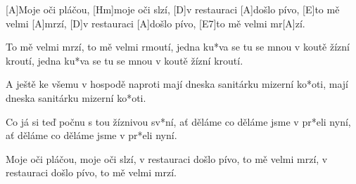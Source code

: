 
[A]Moje oči pláčou, [Hm]moje oči slzí,
[D]v restauraci [A]došlo pívo, [E]to mě velmi [A]mrzí,
[D]v restauraci [A]došlo pívo, [E7]to mě velmi mr[A]zí.

To mě velmi mrzí, to mě velmi rmoutí,
jedna ku*va se tu se mnou v koutě žízní kroutí,
jedna ku*va se tu se mnou v koutě žízní kroutí.

A ještě ke všemu v hospodě naproti
mají dneska sanitárku mizerní ko*oti,
mají dneska sanitárku mizerní ko*oti.

Co já si teď počnu s tou žíznivou sv*ní,
ať děláme co děláme jsme v pr*eli nyní,
ať děláme co děláme jsme v pr*eli nyní.

Moje oči pláčou, moje oči slzí,
v restauraci došlo pívo, to mě velmi mrzí,
v restauraci došlo pívo, to mě velmi mrzí.